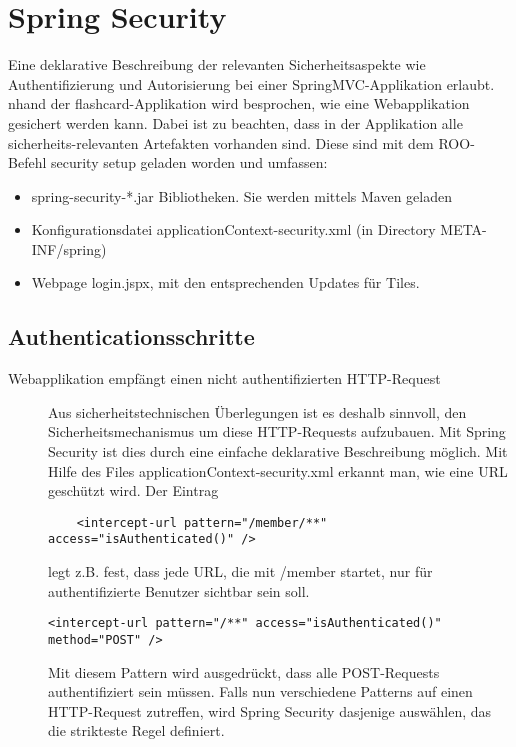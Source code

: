 \documentclass[a4paper,10pt]{scrreprt}
\begin{document}
{\section{Spring Security}
Eine deklarative Beschreibung der relevanten
Sicherheitsaspekte wie Authentifizierung und Autorisierung bei einer SpringMVC-Applikation erlaubt.
nhand der flashcard-Applikation wird besprochen, wie eine Webapplikation gesichert werden kann.
Dabei ist zu beachten, dass in der Applikation alle sicherheits-relevanten Artefakten vorhanden sind.
Diese sind mit dem ROO-Befehl security setup geladen worden und umfassen:
\begin{itemize}
\item spring-security-*.jar Bibliotheken. Sie werden mittels Maven geladen
\item Konfigurationsdatei applicationContext-security.xml (in Directory META-INF/spring)
\item Webpage login.jspx, mit den entsprechenden Updates für Tiles.
\end{itemize}

\subsection{Authenticationsschritte}

\begin{description}
	\item[Webapplikation empfängt einen nicht authentifizierten HTTP-Request]  Aus
sicherheitstechnischen Überlegungen ist es deshalb sinnvoll, den Sicherheitsmechanismus um
diese HTTP-Requests aufzubauen. Mit Spring Security ist dies durch eine einfache deklarative
Beschreibung möglich. Mit Hilfe des Files applicationContext-security.xml erkannt man,
wie eine URL geschützt wird. Der Eintrag
\begin{verbatim}
	<intercept-url pattern="/member/**" access="isAuthenticated()" />
\end{verbatim}

legt z.B. fest, dass jede URL, die mit /member startet, nur für authentifizierte Benutzer sichtbar sein
soll.

\subitem \begin{verbatim}
<intercept-url pattern="/**" access="isAuthenticated()" method="POST" />
\end{verbatim}
Mit diesem Pattern wird ausgedrückt, dass alle POST-Requests authentifiziert sein müssen. Falls
nun verschiedene Patterns auf einen HTTP-Request zutreffen, wird Spring Security dasjenige
auswählen, das die strikteste Regel definiert.


\end{description}}
\end{document}
